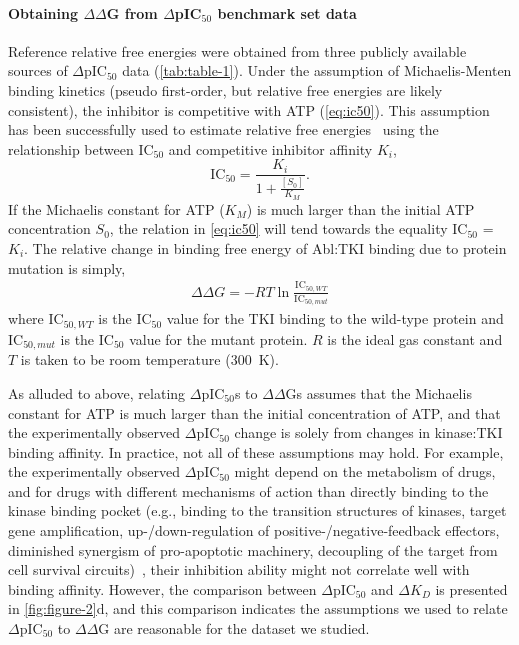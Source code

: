 \documentclass[phd,tocprelim]{cornell}
\renewcommand{\FIG}[1]{\autoref{fig:#1}}
\renewcommand{\TABLE}[1]{\autoref{tab:#1}}
\renewcommand{\EQ}[1]{\autoref{eq:#1}}
\begin{document}
\paragraph{Obtaining $\Delta\Delta$G from $\Delta$pIC$_{50}$ benchmark set data}
Reference relative free energies were obtained from three publicly available sources of $\Delta$pIC$_{50}$ data (\TABLE{table-1}).
Under the assumption of Michaelis-Menten binding kinetics (pseudo first-order, but relative free energies are likely consistent), the inhibitor is competitive with ATP (\EQ{ic50}). 
This assumption has been successfully used to estimate relative free energies~\citep{Price:Bioorg.Med.Chem.Lett.:2000,Luccarelli:J.Chem.TheoryComput.:2010,Michel:J.Med.Chem.:2006,mondal2016} using the relationship between IC$_{50}$ and competitive inhibitor affinity $K_{i}$,
\begin{equation}
\label{eq:ic50}
\mathrm{IC}_{50} = \frac{ K_{i} }{ 1 + \frac{[S_{0}]}{K_{M}} } .
\end{equation}
If the Michaelis constant for ATP ($K_{M}$) is much larger than the initial ATP concentration $S_{0}$, the relation in \EQ{ic50} will tend towards the equality IC$_{50}$ = $K_{i}$. The relative change in binding free energy of Abl:TKI binding due to protein mutation is simply,
\begin{eqnarray}
\Delta\Delta G = - RT \ln \frac{\mathrm{IC}_{50,WT}}{\mathrm{IC}_{50,mut}} \label{eq:ddg}
\end{eqnarray}
where IC$_{50,WT}$ is the IC$_{50}$ value for the TKI binding to the wild-type protein and IC$_{50,mut}$ is the IC$_{50}$ value for the mutant protein. 
$R$ is the ideal gas constant and $T$ is taken to be room temperature (300~K).

As alluded to above, relating $\Delta$pIC$_{50}$s to $\Delta\Delta$Gs assumes that the Michaelis constant for ATP is much larger than the initial concentration of ATP, and that the experimentally observed $\Delta$pIC$_{50}$ change is solely from changes in kinase:TKI binding affinity. In practice, not all of these assumptions may hold. 
For example, the experimentally observed $\Delta$pIC$_{50}$ might depend on the metabolism of drugs, and for drugs with different mechanisms of action than directly binding to the kinase binding pocket (e.g., binding to the transition structures of kinases, target gene amplification, up-/down-regulation of positive-/negative-feedback effectors, diminished synergism of pro-apoptotic machinery, decoupling of the target from cell survival circuits)~\citep{BarouchBentov:2011dx,McDermott:2007kq},
their inhibition ability might not correlate well with binding affinity. 
However, the comparison between $\Delta$pIC$_{50}$ and $\Delta K_{D}$ is presented in \FIG{figure-2}d, and this comparison indicates the assumptions we used to relate $\Delta$pIC$_{50}$ to $\Delta\Delta$G are reasonable for the dataset we studied.
\end{document}
